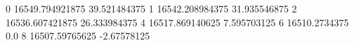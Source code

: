 0 16549.794921875 39.521484375
1 16542.208984375 31.935546875
2 16536.607421875 26.333984375
4 16517.869140625 7.595703125
6 16510.2734375 0.0
8 16507.59765625 -2.67578125
